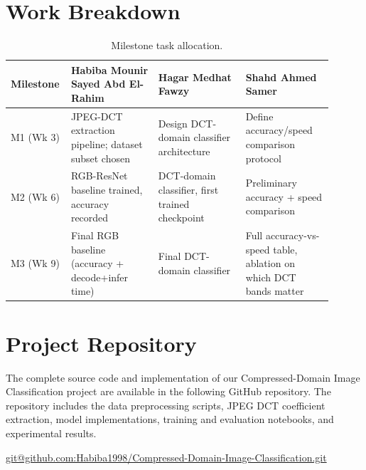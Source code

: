 \documentclass[11pt]{article}
\begin{document}
\section{Work Breakdown}
\label{sec:workbreakdown}
\begin{table}[H]
\centering
\caption{Milestone task allocation.}
\label{tab:tasks}
\begin{tabular}{@{}p{0.12\linewidth}p{0.26\linewidth}p{0.26\linewidth}p{0.26\linewidth}@{}}
\toprule
\textbf{Milestone} & \textbf{Habiba Mounir Sayed Abd El-Rahim} & \textbf{Hagar Medhat Fawzy} & \textbf{Shahd Ahmed Samer} \\
\midrule
M1 (Wk 3) & JPEG-DCT extraction pipeline; dataset subset chosen & Design DCT-domain classifier architecture & Define accuracy/speed comparison protocol \\
M2 (Wk 6) & RGB-ResNet baseline trained, accuracy recorded & DCT-domain classifier, first trained checkpoint & Preliminary accuracy + speed comparison \\
M3 (Wk 9) & Final RGB baseline (accuracy + decode+infer time) & Final DCT-domain classifier & Full accuracy-vs-speed table, ablation on which DCT bands matter \\
\bottomrule
\end{tabular}
\end{table}

\section{Project Repository}
\label{sec:repository}

The complete source code and implementation of our Compressed-Domain Image Classification project are available in the following GitHub repository. The repository includes the data preprocessing scripts, JPEG DCT coefficient extraction, model implementations, training and evaluation notebooks, and experimental results.

\begin{center}
    \url{git@github.com:Habiba1998/Compressed-Domain-Image-Classification.git}
\end{center}



\end{document}
